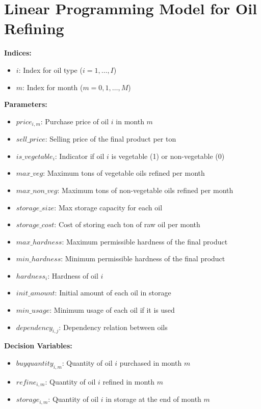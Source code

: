 \documentclass{article}
\begin{document}
\section*{Linear Programming Model for Oil Refining}

\textbf{Indices:}
\begin{itemize}
    \item $i$: Index for oil type ($i = 1, \ldots, I$)
    \item $m$: Index for month ($m = 0, 1, \ldots, M$)
\end{itemize}

\textbf{Parameters:}
\begin{itemize}
    \item $price_{i,m}$: Purchase price of oil $i$ in month $m$
    \item $sell\_price$: Selling price of the final product per ton
    \item $is\_vegetable_{i}$: Indicator if oil $i$ is vegetable (1) or non-vegetable (0)
    \item $max\_veg$: Maximum tons of vegetable oils refined per month
    \item $max\_non\_veg$: Maximum tons of non-vegetable oils refined per month
    \item $storage\_size$: Max storage capacity for each oil
    \item $storage\_cost$: Cost of storing each ton of raw oil per month
    \item $max\_hardness$: Maximum permissible hardness of the final product
    \item $min\_hardness$: Minimum permissible hardness of the final product
    \item $hardness_{i}$: Hardness of oil $i$
    \item $init\_amount$: Initial amount of each oil in storage
    \item $min\_usage$: Minimum usage of each oil if it is used
    \item $dependency_{i,j}$: Dependency relation between oils
\end{itemize}

\textbf{Decision Variables:}
\begin{itemize}
    \item $buyquantity_{i,m}$: Quantity of oil $i$ purchased in month $m$
    \item $refine_{i,m}$: Quantity of oil $i$ refined in month $m$
    \item $storage_{i,m}$: Quantity of oil $i$ in storage at the end of month $m$
\end{itemize}
\end{document}

